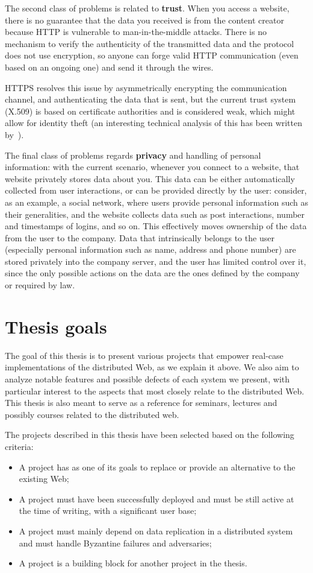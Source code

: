 \documentclass[mscthesis]{usiinfthesis}
\begin{document}
The second class of problems is related to \textbf{trust}. When you access a website, there is no guarantee that the data you received is from the content creator because HTTP is vulnerable to man-in-the-middle attacks. There is no mechanism to verify the authenticity of the transmitted data and the protocol does not use encryption, so anyone can forge valid HTTP communication (even based on an ongoing one) and send it through the wires.

HTTPS resolves this issue by asymmetrically encrypting the communication channel, and authenticating the data that is sent, but the current trust system (X.509) is based on certificate authorities and is considered weak, which might allow for identity theft (an interesting technical analysis of this has been written by~\cite{webarticle:httpssecurity}). %

The final class of problems regards \textbf{privacy} and handling of personal information: with the current scenario, whenever you connect to a website, that website privately stores data about you.
This data can be either automatically collected from user interactions, or can be provided directly by the user: consider, as an example, a social network, where users provide personal information such as their generalities, and the website collects data such as post interactions, number and timestamps of logins, and so on.
This effectively moves ownership of the data from the user to the company. Data that intrinsically belongs to the user (especially personal information such as name, address and phone number) are stored privately into the company server, and the user has limited control over it, since the only possible actions on the data are the ones defined by the company or required by law.

\section{Thesis goals}
The goal of this thesis is to present various projects that empower real-case implementations of the distributed Web, as we explain it above. We also aim to analyze notable features and possible defects of each system we present, with particular interest to the aspects that most closely relate to the distributed Web. This thesis is also meant to serve as a reference for seminars, lectures and possibly courses related to the distributed web.

The projects described in this thesis have been selected based on the following criteria:
\begin{itemize}
	\item A project has as one of its goals to replace or provide an alternative to the existing Web;
	\item A project must have been successfully deployed and must be still active at the time of writing, with a significant user base;
	\item A project must mainly depend on data replication in a distributed system and must handle Byzantine failures and adversaries;
	\item A project is a building block for another project in the thesis.
\end{itemize}
\end{document}

